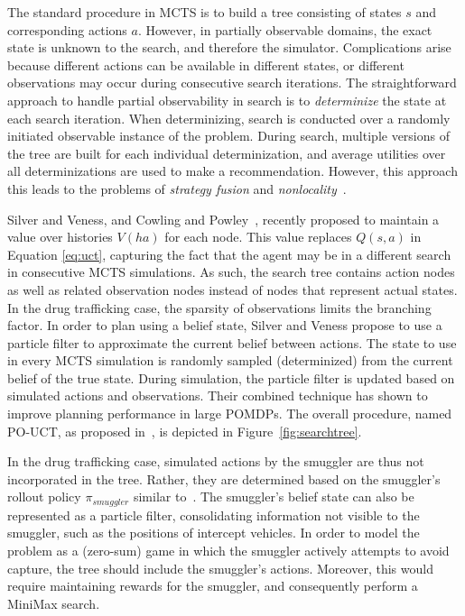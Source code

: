 \documentclass[conference]{IEEEtran}
\begin{document}
The standard procedure in MCTS is to build a tree consisting of states $s$ and corresponding actions $a$. However, in partially observable domains, the exact state is unknown to the search, and therefore the simulator. Complications arise because different actions can be available in different states, or different observations may occur during consecutive search iterations. The straightforward approach to handle partial observability in search is to \emph{determinize} the state at each search iteration. When determinizing, search is conducted over a randomly initiated observable instance of the problem. During search, multiple versions of the tree are built for each individual determinization, and average utilities over all determinizations are used to make a recommendation. However, this approach this leads to the problems of \emph{strategy fusion} and \emph{nonlocality}~\cite{cowling2012information}.

Silver and Veness, and Cowling and Powley~\cite{silver2010monte,cowling2012information}, recently proposed to maintain a value over histories $V(ha)$ for each node. This value replaces $Q(s,a)$ in Equation \ref{eq:uct}, capturing the fact that the agent may be in a different search in consecutive MCTS simulations. As such, the search tree contains action nodes as well as related observation nodes instead of nodes that represent actual states. In the drug trafficking case, the sparsity of observations limits the branching factor. In order to plan using a belief state, Silver and Veness propose to use a particle filter to approximate the current belief between actions. The state to use in every MCTS simulation is randomly sampled (\ie determinized) from the current belief of the true state. During simulation, the particle filter is updated based on simulated actions and observations. Their combined technique has shown to improve planning performance in large POMDPs. The overall procedure, named PO-UCT, as proposed in~\cite{silver2010monte}, is depicted in Figure~\ref{fig:searchtree}. 

In the drug trafficking case, simulated actions by the smuggler are thus not incorporated in the tree. Rather, they are determined based on the smuggler's rollout policy $\pi_{smuggler}$ similar to~\cite{realtime2014}. The smuggler's belief state can also be represented as a particle filter, consolidating information not visible to the smuggler, such as the positions of intercept vehicles. In order to model the problem as a (zero-sum) game in which the smuggler actively attempts to avoid capture, the tree should include the smuggler's actions. Moreover, this would require maintaining rewards for the smuggler, and consequently perform a MiniMax search.
\end{document}
